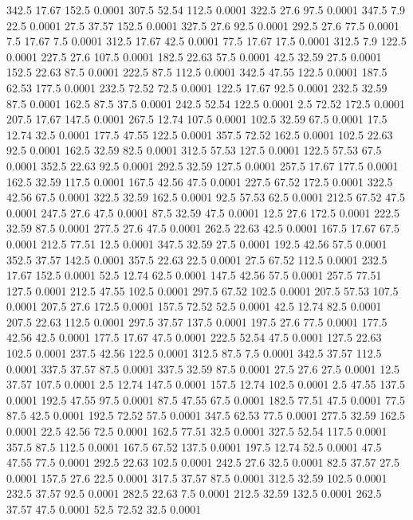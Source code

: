 342.5	17.67	152.5	0.0001
307.5	52.54	112.5	0.0001
322.5	27.6	97.5	0.0001
347.5	7.9	22.5	0.0001
27.5	37.57	152.5	0.0001
327.5	27.6	92.5	0.0001
292.5	27.6	77.5	0.0001
7.5	17.67	7.5	0.0001
312.5	17.67	42.5	0.0001
77.5	17.67	17.5	0.0001
312.5	7.9	122.5	0.0001
227.5	27.6	107.5	0.0001
182.5	22.63	57.5	0.0001
42.5	32.59	27.5	0.0001
152.5	22.63	87.5	0.0001
222.5	87.5	112.5	0.0001
342.5	47.55	122.5	0.0001
187.5	62.53	177.5	0.0001
232.5	72.52	72.5	0.0001
122.5	17.67	92.5	0.0001
232.5	32.59	87.5	0.0001
162.5	87.5	37.5	0.0001
242.5	52.54	122.5	0.0001
2.5	72.52	172.5	0.0001
207.5	17.67	147.5	0.0001
267.5	12.74	107.5	0.0001
102.5	32.59	67.5	0.0001
17.5	12.74	32.5	0.0001
177.5	47.55	122.5	0.0001
357.5	72.52	162.5	0.0001
102.5	22.63	92.5	0.0001
162.5	32.59	82.5	0.0001
312.5	57.53	127.5	0.0001
122.5	57.53	67.5	0.0001
352.5	22.63	92.5	0.0001
292.5	32.59	127.5	0.0001
257.5	17.67	177.5	0.0001
162.5	32.59	117.5	0.0001
167.5	42.56	47.5	0.0001
227.5	67.52	172.5	0.0001
322.5	42.56	67.5	0.0001
322.5	32.59	162.5	0.0001
92.5	57.53	62.5	0.0001
212.5	67.52	47.5	0.0001
247.5	27.6	47.5	0.0001
87.5	32.59	47.5	0.0001
12.5	27.6	172.5	0.0001
222.5	32.59	87.5	0.0001
277.5	27.6	47.5	0.0001
262.5	22.63	42.5	0.0001
167.5	17.67	67.5	0.0001
212.5	77.51	12.5	0.0001
347.5	32.59	27.5	0.0001
192.5	42.56	57.5	0.0001
352.5	37.57	142.5	0.0001
357.5	22.63	22.5	0.0001
27.5	67.52	112.5	0.0001
232.5	17.67	152.5	0.0001
52.5	12.74	62.5	0.0001
147.5	42.56	57.5	0.0001
257.5	77.51	127.5	0.0001
212.5	47.55	102.5	0.0001
297.5	67.52	102.5	0.0001
207.5	57.53	107.5	0.0001
207.5	27.6	172.5	0.0001
157.5	72.52	52.5	0.0001
42.5	12.74	82.5	0.0001
207.5	22.63	112.5	0.0001
297.5	37.57	137.5	0.0001
197.5	27.6	77.5	0.0001
177.5	42.56	42.5	0.0001
177.5	17.67	47.5	0.0001
222.5	52.54	47.5	0.0001
127.5	22.63	102.5	0.0001
237.5	42.56	122.5	0.0001
312.5	87.5	7.5	0.0001
342.5	37.57	112.5	0.0001
337.5	37.57	87.5	0.0001
337.5	32.59	87.5	0.0001
27.5	27.6	27.5	0.0001
12.5	37.57	107.5	0.0001
2.5	12.74	147.5	0.0001
157.5	12.74	102.5	0.0001
2.5	47.55	137.5	0.0001
192.5	47.55	97.5	0.0001
87.5	47.55	67.5	0.0001
182.5	77.51	47.5	0.0001
77.5	87.5	42.5	0.0001
192.5	72.52	57.5	0.0001
347.5	62.53	77.5	0.0001
277.5	32.59	162.5	0.0001
22.5	42.56	72.5	0.0001
162.5	77.51	32.5	0.0001
327.5	52.54	117.5	0.0001
357.5	87.5	112.5	0.0001
167.5	67.52	137.5	0.0001
197.5	12.74	52.5	0.0001
47.5	47.55	77.5	0.0001
292.5	22.63	102.5	0.0001
242.5	27.6	32.5	0.0001
82.5	37.57	27.5	0.0001
157.5	27.6	22.5	0.0001
317.5	37.57	87.5	0.0001
312.5	32.59	102.5	0.0001
232.5	37.57	92.5	0.0001
282.5	22.63	7.5	0.0001
212.5	32.59	132.5	0.0001
262.5	37.57	47.5	0.0001
52.5	72.52	32.5	0.0001
